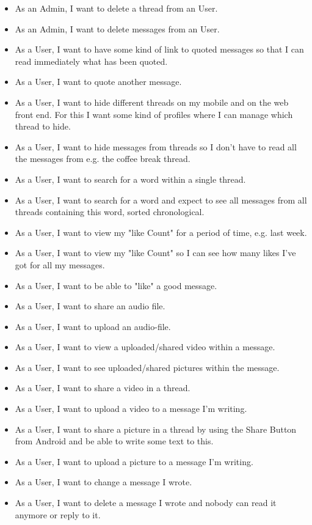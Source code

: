 \documentclass[12pt,a4paper,oneside]{report}
\begin{document}
\begin{itemize}
     \item As an Admin, I want to delete a thread from an User.
     \item As an Admin, I want to delete messages from an User.
     \item As a User, I want to have some kind of link to quoted messages so that I can read immediately what has been quoted.
     \item As a User, I want to quote another message.
     \item As a User, I want to hide different threads on my mobile and on the web front end. For this I want some kind of profiles where I can manage which thread to hide.
     \item As a User, I want to hide messages from threads so I don't have to read all the messages from e.g. the coffee break thread.
     \item As a User, I want to search for a word within a single thread.
     \item As a User, I want to search for a word and expect to see all messages from all threads containing this word, sorted chronological.
     \item As a User, I want to view my "like Count" for a period of time, e.g. last week.
     \item As a User, I want to view my "like Count" so I can see how many likes I've got for all my messages.
     \item As a User, I want to be able to "like" a good message.
     \item As a User, I want to share an audio file.
     \item As a User, I want to upload an audio-file.
     \item As a User, I want to view a uploaded/shared video within a message.
     \item As a User, I want to see uploaded/shared pictures within the message.
     \item As a User, I want to share a video in a thread.
     \item As a User, I want to upload a video to a message I'm writing.
     \item As a User, I want to share a picture in a thread by using the Share Button from Android and be able to write some text to this.
     \item As a User, I want to upload a picture to a message I'm writing.
     \item As a User, I want to change a message I wrote.
     \item As a User, I want to delete a message I wrote and nobody can read it anymore or reply to it. 

\end{itemize}
\end{document}
